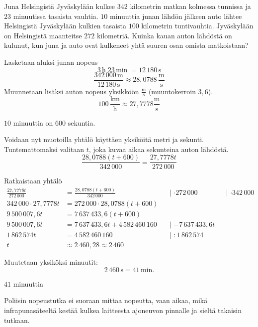 \begin{esimerkki}
Juna Helsingistä Jyväskylään kulkee $342$ kilometrin matkan kolmessa tunnissa ja $23$ minuutissa tasaista vauhtia. $10$ minuuttia junan lähdön jälkeen auto lähtee Helsingistä Jyväskylään kulkien tasaista $100$ kilometrin tuntivauhtia. Jyväskylään on Helsingistä maanteitse $272$ kilometriä. Kuinka kauan auton lähdöstä on kulunut, kun juna ja auto ovat kulkeneet yhtä suuren osan omista matkoistaan?
	\begin{esimratk}
		Lasketaan aluksi junan nopeus
		\[3\,\text{h} \; 23\,\text{min} \; = 12\,180\,\text{s} \]
		\[\frac{342\,000\,\text{m}}{12\,180\,\text{s}} \approx  28,0788\,\frac{\text{m}}{\text{s}} \]
		Muunnetaan lisäksi auton nopeus yksikköön $\frac{\text{m}}{\text{s}}$ (muuntokerroin $3,6$).
		\[100\,\frac{\text{km}}{\text{h}} \approx 27,7778 \frac{\text{m}}{\text{s}} \]
		
		$10$ minuuttia on $600$ sekuntia.
		
		Voidaan nyt muotoilla yhtälö käyttäen yksiköitä metri ja sekunti. Tuntemattomaksi valitaan $t$, joka kuvaa aikaa sekunteina auton lähdöstä.
		\[ \frac{28,0788(t+600)}{342\,000} = \frac{27,7778t}{272\,000} \]
		
		Ratkaistaan yhtälö
		\begin{align*}
			\frac{27,7778t}{272\,000} &= \frac{28,0788(t+600)}{342\,000} &&\text{| $\cdot{272\,000}$} &&\text{| $\cdot{342\,000}$}  \\
			342\,000 \cdot 27,7778t &= 272\,000 \cdot 28,0788(t+600) \\
			9\,500\,007,6t &= 7\,637\,433,6(t+600) \\
			9\,500\,007,6t &= 7\,637\,433,6t + 4\,582\,460\,160 &&\text{| $-7\,637\,433,6t$} \\ 
			1\,862\,574t &= 4\,582\,460\,160 &&\text{| $:{1\,862\,574}$} \\
			t &\approx 2\,460,28 \approx 2\,460
		\end{align*}
		
		Muutetaan yksiköksi minuutit:
		\[2\,460\,\text{s}=41\,\text{min}.\]
	\end{esimratk}
	\begin{esimvast}
		$41$ minuuttia
	\end{esimvast}
\end{esimerkki}

\begin{esimerkki} %
Poliisin nopeustutka ei suoraan mittaa nopeutta, vaan aikaa, mikä infrapunasäteeltä kestää kulkea laitteesta ajoneuvon pinnalle ja sieltä takaisin tutkaan.

\end{esimerkki}
